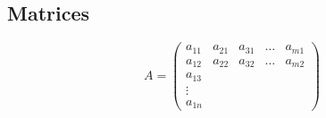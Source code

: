 \documentclass[12pt,a4paper]{book} %
\begin{document}
             \subsection*{Matrices}
               $$A=
               \begin{pmatrix}
                  a_{11} & a_{21} & a_{31} & \hdots & a_{m1} \\
                  a_{12} & a_{22} & a_{32} & \hdots & a_{m2} \\
                  a_{13} \\
                  \vdots \\
                  a_{1n}
              \end{pmatrix}$$
\end{document}
